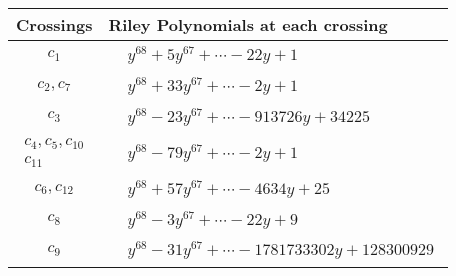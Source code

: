 \documentclass[1p]{elsarticle_modified}
\theoremstyle{definition}
\begin{document}
\begin{tabular}{m{50pt}|m{274pt}}
Crossings & \hspace{64pt}Riley Polynomials at each crossing \\
\hline $$\begin{aligned}c_{1}\end{aligned}$$&$\begin{aligned}
&y^{68}+5 y^{67}+\cdots-22 y+1
\end{aligned}$\\
\hline $$\begin{aligned}c_{2},c_{7}\end{aligned}$$&$\begin{aligned}
&y^{68}+33 y^{67}+\cdots-2 y+1
\end{aligned}$\\
\hline $$\begin{aligned}c_{3}\end{aligned}$$&$\begin{aligned}
&y^{68}-23 y^{67}+\cdots-913726 y+34225
\end{aligned}$\\
\hline $$\begin{aligned}c_{4},c_{5},c_{10}\\c_{11}\end{aligned}$$&$\begin{aligned}
&y^{68}-79 y^{67}+\cdots-2 y+1
\end{aligned}$\\
\hline $$\begin{aligned}c_{6},c_{12}\end{aligned}$$&$\begin{aligned}
&y^{68}+57 y^{67}+\cdots-4634 y+25
\end{aligned}$\\
\hline $$\begin{aligned}c_{8}\end{aligned}$$&$\begin{aligned}
&y^{68}-3 y^{67}+\cdots-22 y+9
\end{aligned}$\\
\hline $$\begin{aligned}c_{9}\end{aligned}$$&$\begin{aligned}
&y^{68}-31 y^{67}+\cdots-1781733302 y+128300929
\end{aligned}$\\
\hline
\end{tabular}
\vskip 2pc
\end{document}
